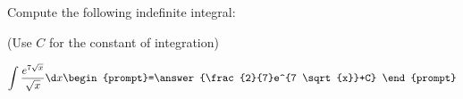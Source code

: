\documentclass{ximera}
\author{Jim Talamo}
\begin{document}
\begin{exercise}
Compute the following indefinite integral:

\begin{prompt} (Use $C$ for the constant of integration) \end{prompt} 

\[
\int \frac{e^{7\sqrt{x}}}{\sqrt{x}} \d x 
\begin{prompt}=\answer{\frac{2}{7}e^{7 \sqrt{x}}+C} \end{prompt}
\]
\end{exercise}
\end{document}
